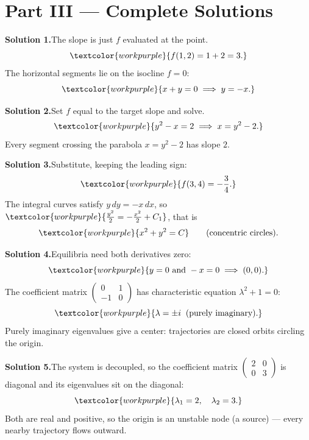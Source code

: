 \clearpage
{}
{}
\section*{Part III --- Complete Solutions}

\noindent\textbf{Solution 1.}\quad The slope is just $f$ evaluated at the point.
\[ \textcolor{workpurple}{f(1,2) = 1 + 2 = 3.} \]
The horizontal segments lie on the isocline $f = 0$:
\[ \textcolor{workpurple}{x + y = 0 \;\Longrightarrow\; y = -x.} \]

\medskip
\noindent\textbf{Solution 2.}\quad Set $f$ equal to the target slope and solve.
\[ \textcolor{workpurple}{y^{2} - x = 2 \;\Longrightarrow\; x = y^{2} - 2.} \]
Every segment crossing the parabola $x = y^{2} - 2$ has slope $2$.

\medskip
\noindent\textbf{Solution 3.}\quad Substitute, keeping the leading sign:
\[ \textcolor{workpurple}{f(3,4) = -\frac{3}{4}.} \]
The integral curves satisfy $y\,dy = -x\,dx$, so
$\textcolor{workpurple}{\frac{y^2}{2} = -\frac{x^2}{2} + C_1}$, that is
\[ \textcolor{workpurple}{x^{2} + y^{2} = C} \qquad\text{(concentric circles).} \]

\medskip
\noindent\textbf{Solution 4.}\quad Equilibria need both derivatives zero:
\[ \textcolor{workpurple}{y = 0 \text{ and } -x = 0 \;\Longrightarrow\; (0,0).} \]
The coefficient matrix
$\left(\begin{smallmatrix}0&1\\-1&0\end{smallmatrix}\right)$ has characteristic
equation $\lambda^2 + 1 = 0$:
\[ \textcolor{workpurple}{\lambda = \pm i \;\;(\text{purely imaginary}).} \]
Purely imaginary eigenvalues give a \textcolor{workpurple}{center}: trajectories
are closed orbits circling the origin.

\medskip
\noindent\textbf{Solution 5.}\quad The system is decoupled, so the coefficient
matrix $\left(\begin{smallmatrix}2&0\\0&3\end{smallmatrix}\right)$ is diagonal
and its eigenvalues sit on the diagonal:
\[ \textcolor{workpurple}{\lambda_1 = 2, \quad \lambda_2 = 3.} \]
Both are real and positive, so the origin is an
\textcolor{workpurple}{unstable node (a source)} --- every nearby trajectory
flows outward.

